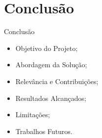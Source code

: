 \section{Conclusão}

\begin{frame}{Conclusão}
    \begin{itemize}
        \item Objetivo do Projeto; \vspace{0.5cm}
        \item Abordagem da Solução; \vspace{0.5cm}
        \item Relevância e Contribuições; \vspace{0.5cm}
        \item Resultados Alcançados; \vspace{0.5cm}
        \item Limitações; \vspace{0.5cm}
        \item Trabalhos Futuros. \vspace{0.5cm}
    \end{itemize}
\end{frame}

